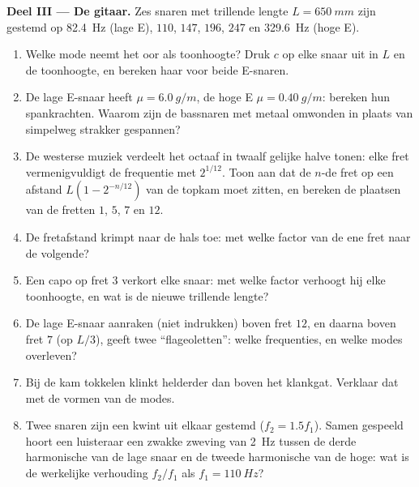 \begin{problem}
\medskip
\noindent\textbf{Deel III --- De gitaar.}
Zes snaren met trillende lengte $L = \qty{650}{mm}$ zijn gestemd op
\qty{82.4}{Hz} (lage E), $110$, $147$, $196$, $247$ en \qty{329.6}{Hz}
(hoge E).
\begin{enumerate}[resume]
  \item Welke mode neemt het oor als toonhoogte? Druk $c$ op elke snaar uit
        in $L$ en de toonhoogte, en bereken haar voor beide E-snaren.
  \item De lage E-snaar heeft $\mu = \qty{6.0}{g/m}$, de hoge E
        $\mu = \qty{0.40}{g/m}$: bereken hun spankrachten. Waarom zijn de
        bassnaren met metaal omwonden in plaats van simpelweg strakker gespannen?
  \item De westerse muziek verdeelt het octaaf in twaalf gelijke halve tonen:
        elke fret vermenigvuldigt de frequentie met $2^{1/12}$. Toon aan dat de
        $n$-de fret op een afstand $L(1 - 2^{-n/12})$ van de topkam moet
        zitten, en bereken de plaatsen van de fretten $1$, $5$, $7$ en $12$.
  \item De fretafstand krimpt naar de hals toe: met welke factor van de ene
        fret naar de volgende?
  \item Een capo op fret $3$ verkort elke snaar: met welke factor
        verhoogt hij elke toonhoogte, en wat is de nieuwe trillende
        lengte?
  \item De lage E-snaar aanraken (niet indrukken) boven fret $12$, en daarna
        boven fret $7$ (op $L/3$), geeft twee ``flageoletten'': welke
        frequenties, en welke modes overleven?
  \item Bij de kam tokkelen klinkt helderder dan boven het klankgat.
        Verklaar dat met de vormen van de modes.
  \item Twee snaren zijn een kwint uit elkaar gestemd ($f_2 = 1.5f_1$). Samen
        gespeeld hoort een luisteraar een zwakke zweving van \qty{2}{Hz}
        tussen de derde harmonische van de lage snaar en de tweede
        harmonische van de hoge: wat is de werkelijke verhouding $f_2/f_1$ als
        $f_1 = \qty{110}{Hz}$?
\end{enumerate}


\end{problem}
